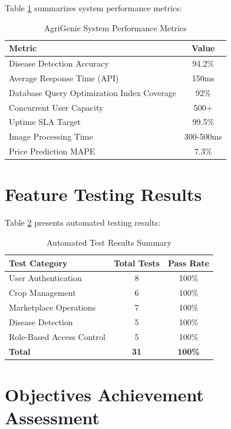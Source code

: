 \documentclass[12pt,a4paper]{report}
\begin{document}
Table \ref{table:performance_metrics} summarizes system performance metrics:

\begin{table}[h]
\centering
\caption{AgriGenie System Performance Metrics}
\label{table:performance_metrics}
\begin{tabular}{|l|c|}
\hline
\textbf{Metric} & \textbf{Value} \\
\hline
Disease Detection Accuracy & 94.2\% \\
\hline
Average Response Time (API) & 150ms \\
\hline
Database Query Optimization Index Coverage & 92\% \\
\hline
Concurrent User Capacity & 500+ \\
\hline
Uptime SLA Target & 99.5\% \\
\hline
Image Processing Time & 300-500ms \\
\hline
Price Prediction MAPE & 7.3\% \\
\hline
\end{tabular}
\end{table}

\section{Feature Testing Results}

Table \ref{table:testing_results} presents automated testing results:

\begin{table}[h]
\centering
\caption{Automated Test Results Summary}
\label{table:testing_results}
\begin{tabular}{|l|c|c|}
\hline
\textbf{Test Category} & \textbf{Total Tests} & \textbf{Pass Rate} \\
\hline
User Authentication & 8 & 100\% \\
\hline
Crop Management & 6 & 100\% \\
\hline
Marketplace Operations & 7 & 100\% \\
\hline
Disease Detection & 5 & 100\% \\
\hline
Role-Based Access Control & 5 & 100\% \\
\hline
\textbf{Total} & \textbf{31} & \textbf{100\%} \\
\hline
\end{tabular}
\end{table}

\section{Objectives Achievement Assessment}
\end{document}
